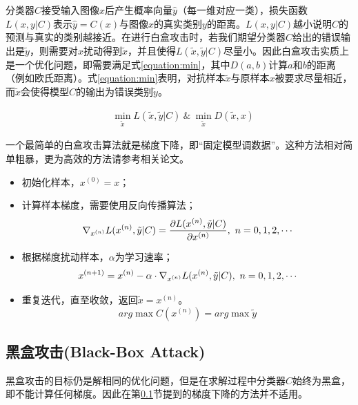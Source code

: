 \documentclass[journal, a4paper]{IEEEtran}
\begin{document}
分类器$C$接受输入图像$x$后产生概率向量$\hat y$（每一维对应一类），损失函数$L(x,y|C)$表示$\hat y=C(x)$与图像$x$的真实类别$y$的距离。$L(x,y|C)$越小说明$C$的预测与真实的类别越接近。在进行白盒攻击时，若我们期望分类器$C$给出的错误输出是$\tilde y$，则需要对$x$扰动得到$\tilde x$，并且使得$L(\tilde x,\tilde y|C)$尽量小。因此白盒攻击实质上是一个优化问题，即需要满足式\ref{equation:min}，其中$D(a,b)$计算$a$和$b$的距离（例如欧氏距离）。式\ref{equation:min}表明，对抗样本$\tilde x$与原样本$x$被要求尽量相近，而$\tilde x$会使得模型$C$的输出为错误类别$\tilde y$。


\begin{align}
    &\min_{\tilde x} L(\tilde x,\tilde y|C)\ \&\ \min_{\tilde x} D(\tilde x, x) \label{equation:min}
\end{align}

一个最简单的白盒攻击算法就是梯度下降，即``固定模型调数据''。这种方法相对简单粗暴，更为高效的方法请参考相关论文。

\begin{itemize}
    \item 初始化样本，$x^{(0)}=x$；
    \item 计算样本梯度，需要使用反向传播算法；
\begin{equation}
    \nabla_{x^{(n)}}L(x^{(n)},\tilde y|C)=\frac{\partial L(x^{(n)},\tilde y|C)}{\partial x^{(n)}},\ n=0,1,2,\cdots \notag
\end{equation}
    \item 根据梯度扰动样本，$\alpha$为学习速率；
\begin{equation}
    x^{(n+1)}=x^{(n)}-\alpha\cdot\nabla_{x^{(n)}}L(x^{(n)},\tilde y|C),\ n=0,1,2,\cdots \notag
\end{equation}
    \item 重复迭代，直至收敛，返回$\tilde x=x^{(n)}$。
\begin{equation}
    arg\max C(x^{(n)})=arg\max \tilde y \label{equation:converge}
\end{equation}
\end{itemize}

\subsection{黑盒攻击(Black-Box Attack)}
\label{section:adversarial attack;subsection:black-box}

黑盒攻击的目标仍是解相同的优化问题，但是在求解过程中分类器$C$始终为黑盒，即不能计算任何梯度。因此在第\ref{section:adversarial attack;subsection:black-box}节提到的梯度下降的方法并不适用。
\end{document}
